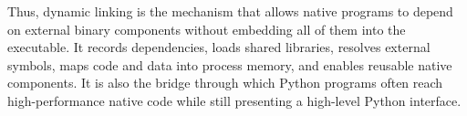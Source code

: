 Thus, dynamic linking is the mechanism that allows native programs to depend on external binary components without embedding all of them into the executable. It records dependencies, loads shared libraries, resolves external symbols, maps code and data into process memory, and enables reusable native components. It is also the bridge through which Python programs often reach high-performance native code while still presenting a high-level Python interface.